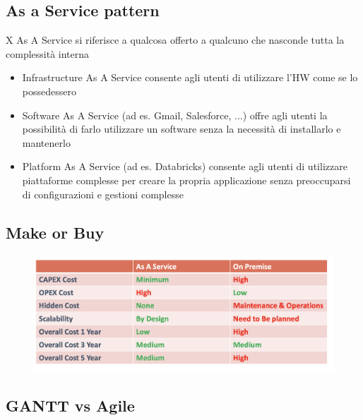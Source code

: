 \documentclass{article}
\begin{document}
\subsection{As a Service pattern}
X As A Service si riferisce a qualcosa offerto a qualcuno che nasconde tutta la complessità interna
\begin{itemize}
    \item Infrastructure As A Service consente agli utenti di utilizzare l'HW come se lo possedessero
    \item Software As A Service (ad es. Gmail, Salesforce, ...) offre agli utenti la possibilità di farlo
utilizzare un software senza la necessità di installarlo e mantenerlo
    \item Platform As A Service (ad es. Databricks) consente agli utenti di utilizzare piattaforme complesse per creare la propria applicazione senza preoccuparsi di configurazioni e gestioni complesse
\end{itemize}
\subsection{Make or Buy}

\begin{figure}[htp]
    \centering
    \includegraphics[width=\linewidth]{fig/make_or_buy.png}
    \label{fig:Make Or Buy}
\end{figure}

\subsection{GANTT vs Agile}
\end{document}

